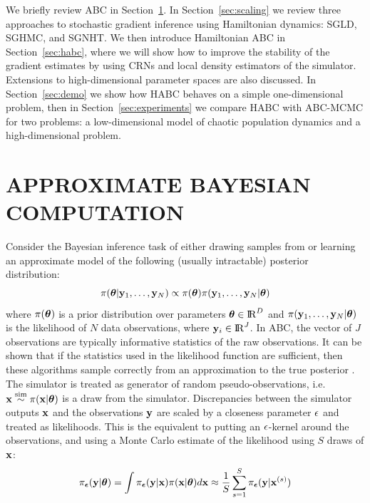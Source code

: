 \documentclass[]{article}
\begin{document}
 
We briefly review ABC in Section~\ref{sec:abc}.  In Section~\ref{sec:scaling} we review three approaches to stochastic gradient inference using Hamiltonian dynamics: SGLD, SGHMC, and SGNHT.  We then introduce Hamiltonian ABC in Section~\ref{sec:habc}, where  we will show how to improve the stability of the gradient estimates by using CRNs and local density estimators of the simulator.  Extensions to high-dimensional parameter spaces are also discussed.  In Section~\ref{sec:demo} we show how HABC behaves on a simple one-dimensional problem, then in Section~\ref{sec:experiments} we compare HABC with ABC-MCMC for two problems: a low-dimensional model of chaotic population dynamics and a high-dimensional problem. 
 


\section{APPROXIMATE BAYESIAN COMPUTATION}\label{sec:abc}
Consider the Bayesian inference task of either drawing samples from or learning an approximate model of the following (usually intractable) posterior distribution:
\begin{equation}
  \pi({\bm \theta} | {\bf y}_1, \ldots, {\bf y}_N ) \propto \pi({\bm \theta}) \pi( {\bf y}_1, \ldots, {\bf y}_N  | {\bm \theta} )
\end{equation}
where $\pi({\bm \theta})$ is a prior distribution over parameters ${\bm \theta} \in {\rm I\!R}^{D}$ and $\pi( {\bf y}_1, \ldots, {\bf y}_N  | {\bm \theta} )$ is the likelihood of $N$ data observations, where ${\bf y}_i \in {\rm I\!R}^J$.  In ABC, the vector of $J$ observations are typically informative statistics of the raw observations.  It can be shown that if the statistics used in the likelihood function are sufficient, then these algorithms sample correctly from an approximation to the true posterior \cite{marin:2012}.  
  The simulator is treated as generator of random pseudo-observations, i.e. ${\bf x} \overset{\operatorname{sim}}{\sim} \pi( {\bf x} | {\bm \theta} )$ is a draw from the simulator.  Discrepancies between the simulator outputs ${\bf x}$ and the observations ${\bf y}$ are scaled by a closeness parameter $\epsilon$ and treated as likelihoods.  This is the equivalent to putting an $\epsilon$-kernel around the observations, and using a Monte Carlo estimate of the likelihood using $S$ draws of ${\bf x}$: 
\begin{equation}
  \pi_{{\bm {\epsilon}}}( {\bf y} | {\bm \theta} ) =  \int \pi_{{\bm {\epsilon}}}({\bf y} | {\bf x} ) \pi( {\bf x} | {\bm \theta} ) d{\bf x} 
                           \approx  \frac{1}{S} \sum_{s=1}^S \pi_{{\bm {\epsilon}}}({\bf y} | {\bf x}^{(s)} ) \label{eq:abc_mc_approx}
\end{equation}
\end{document}
